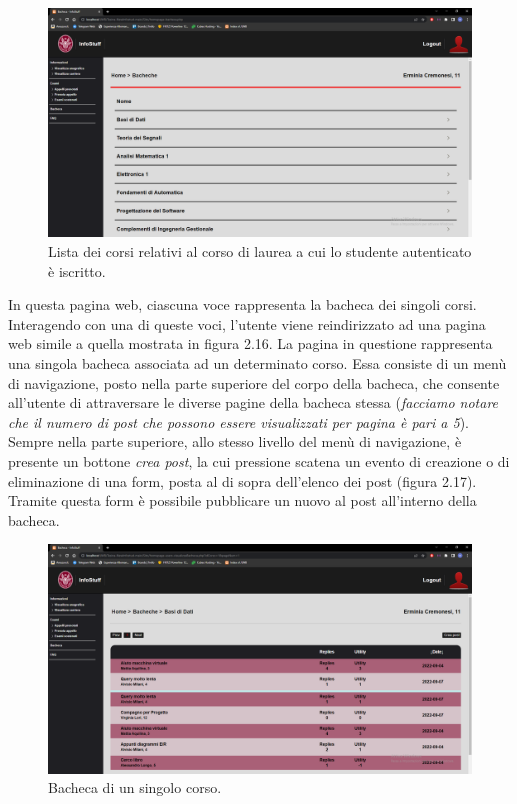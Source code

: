 \documentclass [a4paper,11pt]{book}
\begin{document}
\begin{figure}
\centering
\includegraphics[scale=0.3]{figura2-15.png}
\caption{Lista dei corsi relativi al corso di laurea a cui lo studente autenticato è iscritto.}
\end{figure}

In questa pagina web, ciascuna voce rappresenta la bacheca dei singoli corsi. Interagendo con una di queste voci, l'utente viene reindirizzato ad una pagina web simile a quella mostrata in figura 2.16. La pagina in questione rappresenta una singola bacheca associata ad un determinato corso. Essa consiste di un menù di navigazione, posto nella parte superiore del corpo della bacheca, che consente all'utente di attraversare le diverse pagine della bacheca stessa (\emph{facciamo notare che il numero di post che possono essere visualizzati per pagina è pari a 5}). Sempre nella parte superiore, allo stesso livello del menù di navigazione, è presente un bottone \emph{crea post}, la cui pressione scatena un evento di creazione o di eliminazione di una form, posta al di sopra dell'elenco dei post (figura 2.17). Tramite questa form è possibile pubblicare un nuovo al post all'interno della bacheca.

\begin{figure}
\centering
\includegraphics[scale=0.3]{figura2-16.png}
\caption{Bacheca di un singolo corso.}
\end{figure}
\end{document}
